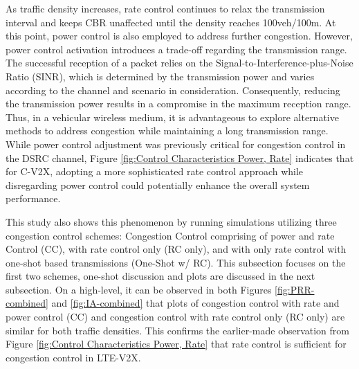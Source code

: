 \documentclass[iicol]{sn-jnl}%
\theoremstyle{thmstyleone}%
\theoremstyle{thmstyletwo}%
\theoremstyle{thmstylethree}%
\begin{document}
As traffic density increases, rate control continues to relax the transmission interval and keeps CBR unaffected until the density reaches 100veh/100m. At this point, power control is also employed to address further congestion.
However, power control activation introduces a trade-off regarding the transmission range. The successful reception of a packet relies on the Signal-to-Interference-plus-Noise Ratio (SINR), which is determined by the transmission power and varies according to the channel and scenario in consideration. Consequently, reducing the transmission power results in a compromise in the maximum reception range. Thus, in a vehicular wireless medium, it is advantageous to explore alternative methods to address congestion while maintaining a long transmission range. While power control adjustment was previously critical for congestion control in the DSRC channel, Figure \mbox{\ref{fig:Control Characteristics Power, Rate}} indicates that for C-V2X, adopting a more sophisticated rate control approach while disregarding power control could potentially enhance the overall system performance.

This study also shows this phenomenon by running simulations utilizing three congestion control schemes: Congestion Control comprising of power and rate Control (CC), with rate control only (RC only), and with only rate control with one-shot based transmissions (One-Shot w/ RC). This subsection focuses on the first two schemes, one-shot discussion and plots are discussed in the next subsection. On a high-level, it can be observed in both Figures \mbox{\ref{fig:PRR-combined}} and \mbox{\ref{fig:IA-combined}} that plots of congestion control with rate and power control (CC) and congestion control with rate control only (RC only) are similar for both traffic densities. This confirms the earlier-made observation from Figure \mbox{\ref{fig:Control Characteristics Power, Rate}} that rate control is sufficient for congestion control in LTE-V2X.
\end{document}
